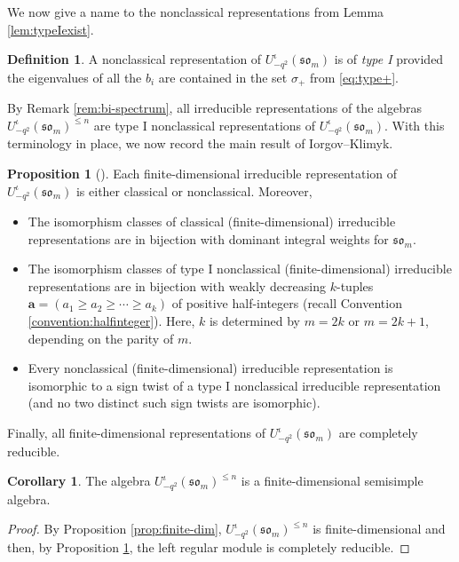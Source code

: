 \documentclass[10pt]{amsart}
\numberwithin{equation}{section}
\theoremstyle{definition}
\newtheorem{cor}[thm]{Corollary}
\newtheorem{prop}[thm]{Proposition}
\newtheorem{defn}[thm]{Definition}
\newcommand{\som}[1][m]{\mathfrak{so}_{#1}}
\newcommand{\iqUsom}[1][m]{{U}^{\iota}_{-q^2}(\som[#1])}
\newcommand{\ab}{\mathbf{a}}
\begin{document}
We now give a name to the nonclassical representations from Lemma \ref{lem:typeIexist}.

\begin{defn}\label{def:nonclassical-typeI}
A nonclassical representation of $\iqUsom$ is of \emph{type I} 
provided the eigenvalues of all the $b_i$ are contained in the set $\sigma_+$ 
from \eqref{eq:type+}.
\end{defn}

By Remark \ref{rem:bi-spectrum}, 
all irreducible representations of the algebras $\iqUsom^{\le n}$
are type I nonclassical representations of $\iqUsom$.
With this terminology in place, we now record the main result of Iorgov--Klimyk.

\begin{prop}[{\cite[Theorem 4 and its Corollary]{MR2143754}}]\label{prop-classification-thm}
Each finite-dimensional irreducible 
representation of $\iqUsom$ is either classical or nonclassical.
Moreover, 
\begin{itemize}
\item The isomorphism classes of classical (finite-dimensional) irreducible representations are in bijection with dominant integral weights for $\som$. 
\item The isomorphism classes of type I nonclassical (finite-dimensional) irreducible representations are in bijection 
with weakly decreasing $k$-tuples $\ab = (a_1 \ge a_2 \ge \cdots \ge a_k)$ of positive half-integers 
(recall Convention \ref{convention:halfinteger}). Here, $k$ is determined by $m = 2k$ or $m=2k+1$, depending on the parity of $m$.
\item Every nonclassical (finite-dimensional) irreducible representation is isomorphic to a sign twist of a type I nonclassical irreducible representation
(and no two distinct such sign twists are isomorphic).
\end{itemize}
Finally, all finite-dimensional representations of $\iqUsom$ are completely reducible.
\end{prop}

\begin{cor}\label{cor:complete-reducibility}
The algebra $\iqUsom^{\le n}$ is a finite-dimensional semisimple algebra.
\end{cor}
\begin{proof}
By Proposition \ref{prop:finite-dim}, $\iqUsom^{\le n}$ is finite-dimensional 
and then, by Proposition \ref{prop-classification-thm}, the left regular module is completely reducible.
	\end{proof}
\end{document}
